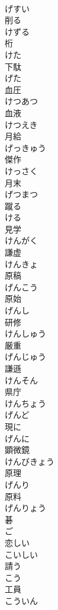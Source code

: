 \documentclass[8pt]{extreport}
\begin{document}
\begin{CJK}{UTF8}{min}
\\	げすい	
\\	削る 
\\	けずる	
\\	桁 
\\	けた	
\\	下駄 
\\	げた	
\\	血圧 
\\	けつあつ	
\\	血液 
\\	けつえき	
\\	月給 
\\	げっきゅう	
\\	傑作 
\\	けっさく	
\\	月末 
\\	げつまつ	
\\	蹴る 
\\	ける	
\\	見学 
\\	けんがく	
\\	謙虚 
\\	けんきょ	
\\	原稿 
\\	げんこう	
\\	原始 
\\	げんし	
\\	研修 
\\	けんしゅう	
\\	厳重 
\\	げんじゅう	
\\	謙遜 
\\	けんそん	
\\	県庁 
\\	けんちょう	
\\	げんど	
\\	現に 
\\	げんに	
\\	顕微鏡 
\\	けんびきょう	
\\	原理 
\\	げんり	
\\	原料 
\\	げんりょう	
\\	碁 
\\	ご	
\\	恋しい 
\\	こいしい	
\\	請う 
\\	こう	
\\	工員 
\\	こういん	

\end{CJK}
\end{document}
